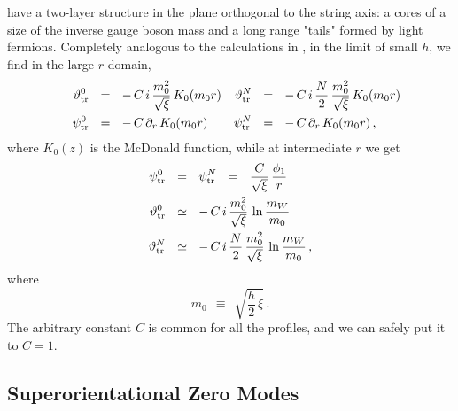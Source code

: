 \documentclass[12pt]{article}
\newcommand{\p}{\partial}
\newcommand{\pts}{\psi_{\rm tr}^0}
\newcommand{\ptN}{\psi_{\rm tr}^N}
\newcommand{\tts}{\vartheta_{\rm tr}^0}
\newcommand{\ttN}{\vartheta_{\rm tr}^N}
\begin{document}
 have a two-layer structure in the plane
orthogonal to the string axis: a cores of a size of the inverse gauge boson mass and a long range
"tails" formed by light fermions.
	Completely analogous to the calculations in \cite{GSYmmodel,BSYhet}, in the limit of 
	small $h$, we find in the large-$r$ domain,
\begin{align*}
%
	&& \tts &~~=~~ -\, C\,i\,\frac{m_0^2}{\sqrt{\xi}}\, K_0(m_0 r) 
	& \ttN & ~~=~~ -\, C\,i\,\frac{N}{2}\,\frac{m_0^2}{\sqrt{\xi}}\,K_0(m_0 r) \\
%
	&& \pts &~~=~~ -\, C\,\p_r\,K_0(m_0 r) 
	& \ptN & ~~=~~ -\, C\,\p_r\,K_0(m_0 r)\,,
\end{align*}
	where $ K_0(z) $ is the McDonald function, 
	while at intermediate $ r $ we get
\begin{align*}
%
	\pts & ~~=~~ \ptN ~~=~~ \frac{C}{\sqrt{\xi}}\,\frac{\phi_1}{r}
	\\
%
	\tts & ~~\simeq~~ -\,C\,i\,\frac{m_0^2}{\sqrt{\xi}}\,\ln\frac{m_W}{m_0}
	\\
%
	\ttN & ~~\simeq~~ -\,C\,i\,\frac{N}{2}\,\frac{m_0^2}{\sqrt{\xi}}\,\ln\frac{m_W}{m_0}\,,
\end{align*}
where 
\[
	m_0 ~~\equiv~~ \sqrt{\frac{h}{2}\, \xi}\,.
\]
	The arbitrary constant $ C $ is common for all the profiles, and we can safely put
	it to $ C = 1 $.


\subsection{Superorientational Zero Modes}
\end{document}

